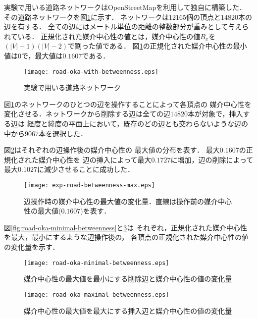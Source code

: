 実験で用いる道路ネットワークはOpenStreetMap\cite{OpenStreetMap}を利用して独自に構築した．
その道路ネットワークを図\ref{fig:road-okayama}に示す．
ネットワークは$12165$個の頂点と$14820$本の辺を有する．
全ての辺にはメートル単位の距離の整数部分が重みとして与えられている．
正規化された媒介中心性の値とは，媒介中心性の値$B_x$を$(|V|-1)(|V|-2)$で割った値である．
図\ref{fig:road-okayama}の正規化された媒介中心性の最小値は$0$で，最大値は$0.1607$である．

\begin{figure}[tb]
  \centering
  \texttt{[image: road-oka-with-betweenness.eps]}
  \caption{実験で用いる道路ネットワーク}
  \label{fig:road-okayama}
\end{figure}

図\ref{fig:road-okayama}のネットワークのひとつの辺を操作することによって各頂点の
媒介中心性を変化させる．ネットワークから削除する辺は全ての辺$14820$本が対象で，挿入する辺は
経度と緯度の平面上において，既存のどの辺とも交わらないような辺の中から$9067$本を選択した．

図\ref{fig:exp-road-betweenness-max}はそれぞれの辺操作後の媒介中心性の
最大値の分布を表す．
最大$0.1607$の正規化された媒介中心性を
辺の挿入によって最大$0.1727$に増加，辺の削除によって最大$0.1027$に減少させることに成功した．

\begin{figure}[tb]
  \centering
  \texttt{[image: exp-road-betweenness-max.eps]}
  \caption{辺操作時の媒介中心性の最大値の変化量．直線は操作前の媒介中心性の最大値($0.1607$)を表す．}
  \label{fig:exp-road-betweenness-max}
\end{figure}

図\ref{fig:road-oka-minimal-betweenness}と\ref{fig:road-oka-maximal-betweenness}は
それぞれ，正規化された媒介中心性を最大，最小にするような辺操作後の，
各頂点の正規化された媒介中心性の値の変化量を示す．

\begin{figure}[tb]
   \begin{minipage}{0.48\textwidth}
     \centering
     \texttt{[image: road-oka-minimal-betweenness.eps]}
     \caption{媒介中心性の最大値を最小にする削除辺と媒介中心性の値の変化量}
     \label{fig:road-oka-minimal-betweenness}
   \end{minipage}\hfill
   \begin{minipage}{0.48\textwidth}
     \centering
     \texttt{[image: road-oka-maximal-betweenness.eps]}
     \caption{媒介中心性の最大値を最大にする挿入辺と媒介中心性の値の変化量}
     \label{fig:road-oka-maximal-betweenness}
   \end{minipage}
\end{figure}

